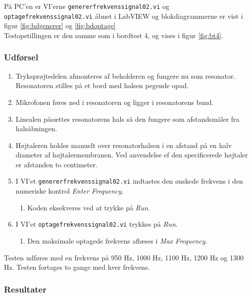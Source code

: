 		På PC'en er VI'erne \texttt{genererfrekvenssignal02.vi} og \texttt{optagefrekvenssignal02.vi} åbnet i LabVIEW og blokdiagrammerne er vist i figur \ref{fig:bdgenerer} og \ref{fig:bdoptage} \\ Testopstillingen er den samme som i bordtest 4, og vises i figur \ref{fig:bt4}.  
		

		\subsubsection{Udførsel}
			
			\begin{enumerate}
				\item Tryksprøjtedelen afmonteres af beholderen og fungere nu som resonator. Resonatoren stilles på et bord med halsen pegende opad. 
				\item Mikrofonen føres ned i resonatoren og ligger i resonatorens bund. 
				\item Linealen påsættes resonatorens hals så den fungere som afstandsmåler fra halsåbningen.
				\item Højtaleren holdes manuelt over resonatorhalsen i en afstand på en halv diameter af højtalermembranen. Ved anvendelse ef den specificerede højtaler er afstanden to centimeter. 
				\item I VI'et \texttt{genererfrekvenssignal02.vi} indtastes den ønskede frekvens i den numeriske kontrol \textit{Enter Frequency}. 
					\begin{enumerate}
						\item Koden eksekveres ved at trykke på \textit{Run}. 
					\end{enumerate} 
				\item I VI'et \texttt{optagefrekvenssignal02.vi} trykkes på \textit{Run}. 
					\begin{enumerate}
						\item Den maksimale optagede frekvens aflæses i \textit{Max Frequency}. 
					\end{enumerate}	 	
			\end{enumerate}
			
			Testen udføres med en frekvens på 950 Hz, 1000 Hz, 1100 Hz, 1200 Hz og 1300 Hz. Testen fortages to gange med hver frekvens.  
			
			\subsubsection{Resultater}
			
